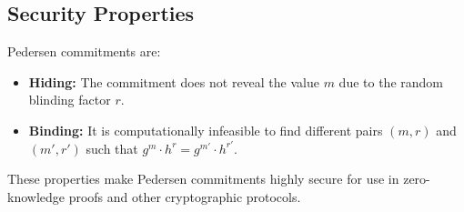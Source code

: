 \documentclass[12pt,a4paper]{report}
\begin{document}
\subsection{Security Properties}
Pedersen commitments are:
\begin{itemize}
    \item \textbf{Hiding:} The commitment does not reveal the value \( m \) due to the random blinding factor \( r \).
    \item \textbf{Binding:} It is computationally infeasible to find different pairs \( (m, r) \) and \( (m', r') \) such that \( g^m \cdot h^r = g^{m'} \cdot h^{r'} \).
\end{itemize}
These properties make Pedersen commitments highly secure for use in zero-knowledge proofs and other cryptographic protocols.
\end{document}
